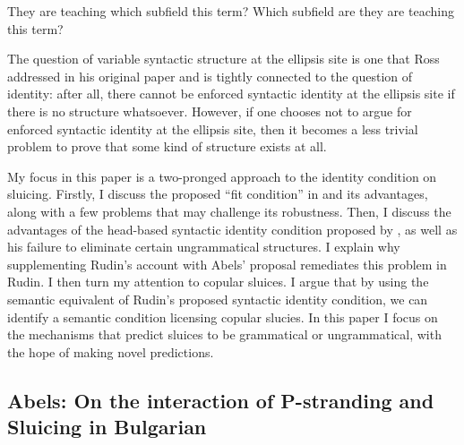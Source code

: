 \documentclass{turabian-researchpaper}
\begin{document}
\begin{exe}
\ex\label{whichsubfield}
\begin{xlist}
\ex They are teaching which subfield this term? 
\ex Which subfield are they are teaching this term? 
\end{xlist}
\end{exe}

The question of variable syntactic structure at the ellipsis site is one that Ross addressed in his original paper and is tightly connected to the question of identity: after all, there cannot be enforced syntactic identity at the ellipsis site if there is no structure whatsoever. However, if one chooses not to argue for enforced syntactic identity at the ellipsis site, then it becomes a less trivial problem to prove that some kind of structure exists at all. 

My focus in this paper is a two-pronged approach to the identity condition on sluicing. 
Firstly, I discuss the proposed ``fit condition'' in \citet{abelsfitcondition} and its advantages, along with a few problems that may challenge its robustness. Then, I discuss the advantages of the head-based syntactic identity condition proposed by \citet{rudin}, as well as his failure to eliminate certain ungrammatical structures. I explain why supplementing Rudin's account with Abels' proposal remediates this problem in Rudin. I then turn my attention to copular sluices. I argue that by using the semantic equivalent of Rudin's proposed syntactic identity condition, we can identify a semantic condition licensing copular slucies. In this paper I focus on the mechanisms that predict sluices to be grammatical or ungrammatical, with the hope of making novel predictions.  

\subsection{Abels: On the interaction of P-stranding and Sluicing in Bulgarian} 
\end{document}

